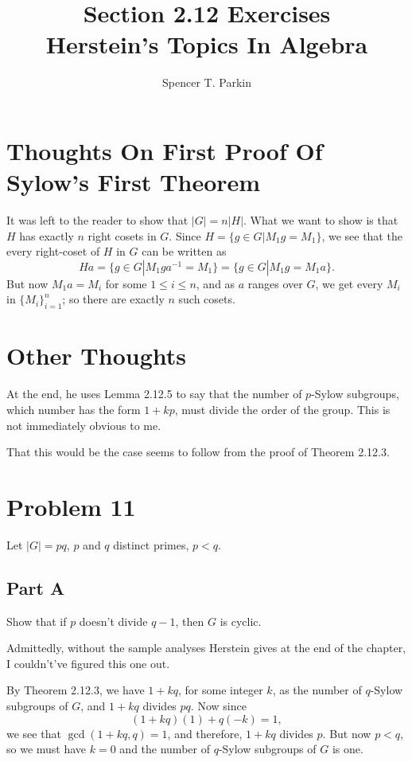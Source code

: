 \documentclass[12pt]{article}
\title{Section 2.12 Exercises\\Herstein's Topics In Algebra}
\author{Spencer T. Parkin}
\begin{document}
\maketitle

\section*{Thoughts On First Proof Of Sylow's First Theorem}

It was left to the reader to show that $|G|=n|H|$.
What we want to show is that $H$ has exactly $n$ right
cosets in $G$.  Since $H=\{g\in G|M_1g=M_1\}$, we see
that the every right-coset of $H$ in $G$ can be written as
\begin{equation*}
Ha=\{g\in G|M_1ga^{-1}=M_1\}=\{g\in G|M_1g=M_1a\}.
\end{equation*}
But now $M_1a=M_i$ for some $1\leq i\leq n$, and as $a$ ranges over $G$,
we get every $M_i$ in $\{M_i\}_{i=1}^n$; so there are exactly $n$ such cosets.

\section*{Other Thoughts}

At the end, he uses Lemma 2.12.5 to say that the number of $p$-Sylow subgroups,
which number has the form $1+kp$, must divide the order of the group.  This is not immediately obvious to me.

That this would be the case seems to follow from the proof of Theorem 2.12.3.

\section*{Problem 11}

Let $|G|=pq$, $p$ and $q$ distinct primes, $p<q$.

\subsection*{Part A}

Show that if $p$ doesn't divide $q-1$, then $G$ is cyclic.

Admittedly, without the sample analyses Herstein gives at the end of the chapter,
I couldn't've figured this one out.

By Theorem 2.12.3, we have $1+kq$, for some integer $k$, as the number of $q$-Sylow subgroups of $G$,
and $1+kq$ divides $pq$.
Now since
\begin{equation*}
(1+kq)(1) + q(-k) = 1,
\end{equation*}
we see that $\gcd(1+kq,q)=1$, and therefore, $1+kq$ divides $p$.  But now $p<q$,
so we must have $k=0$ and the number of $q$-Sylow subgroups of $G$ is one.
\end{document}
